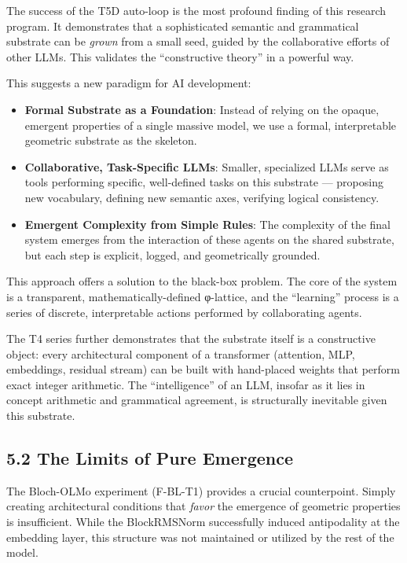 \documentclass[
  twocolumn,
  10pt,
  a4paper]{article}
\providecommand{\tightlist}{%
  \setlength{\itemsep}{0pt}\setlength{\parskip}{0pt}}
\begin{document}
The success of the T5D auto-loop is the most profound finding of this
research program. It demonstrates that a sophisticated semantic and
grammatical substrate can be \emph{grown} from a small seed, guided by
the collaborative efforts of other LLMs. This validates the
``constructive theory'' in a powerful way.

This suggests a new paradigm for AI development:

\begin{itemize}
\tightlist
\item
  \textbf{Formal Substrate as a Foundation}: Instead of relying on the
  opaque, emergent properties of a single massive model, we use a
  formal, interpretable geometric substrate as the skeleton.
\item
  \textbf{Collaborative, Task-Specific LLMs}: Smaller, specialized LLMs
  serve as tools performing specific, well-defined tasks on this
  substrate --- proposing new vocabulary, defining new semantic axes,
  verifying logical consistency.
\item
  \textbf{Emergent Complexity from Simple Rules}: The complexity of the
  final system emerges from the interaction of these agents on the
  shared substrate, but each step is explicit, logged, and geometrically
  grounded.
\end{itemize}

This approach offers a solution to the black-box problem. The core of
the system is a transparent, mathematically-defined φ-lattice, and the
``learning'' process is a series of discrete, interpretable actions
performed by collaborating agents.

The T4 series further demonstrates that the substrate itself is a
constructive object: every architectural component of a transformer
(attention, MLP, embeddings, residual stream) can be built with
hand-placed weights that perform exact integer arithmetic. The
``intelligence'' of an LLM, insofar as it lies in concept arithmetic and
grammatical agreement, is structurally inevitable given this substrate.

\hypertarget{the-limits-of-pure-emergence}{%
\subsection{5.2 The Limits of Pure
Emergence}\label{the-limits-of-pure-emergence}}

The Bloch-OLMo experiment (F-BL-T1) provides a crucial counterpoint.
Simply creating architectural conditions that \emph{favor} the emergence
of geometric properties is insufficient. While the BlockRMSNorm
successfully induced antipodality at the embedding layer, this structure
was not maintained or utilized by the rest of the model.
\end{document}
